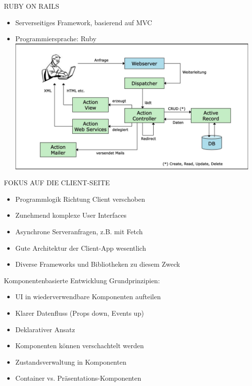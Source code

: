 \begin{definition}{RUBY ON RAILS}
\begin{itemize}
  \item Serverseitiges Framework, basierend auf MVC
  \item Programmiersprache: Ruby\\
\includegraphics[width=\linewidth]{images/2025_01_02_22162ee5453ad0230328g-09}
\end{itemize}
\end{definition}

\begin{definition}{FOKUS AUF DIE CLIENT-SEITE}
\begin{itemize}
  \item Programmlogik Richtung Client verschoben
  \item Zunehmend komplexe User Interfaces
  \item Asynchrone Serveranfragen, z.B. mit Fetch
  \item Gute Architektur der Client-App wesentlich
  \item Diverse Frameworks und Bibliotheken zu diesem Zweck
\end{itemize}
\end{definition}

\begin{concept}{Komponentenbasierte Entwicklung}
    Grundprinzipien:
    \begin{itemize}
        \item UI in wiederverwendbare Komponenten aufteilen
        \item Klarer Datenfluss (Props down, Events up)
        \item Deklarativer Ansatz
        \item Komponenten können verschachtelt werden
        \item Zustandsverwaltung in Komponenten
        \item Container vs. Präsentations-Komponenten
    \end{itemize}
\end{concept}

